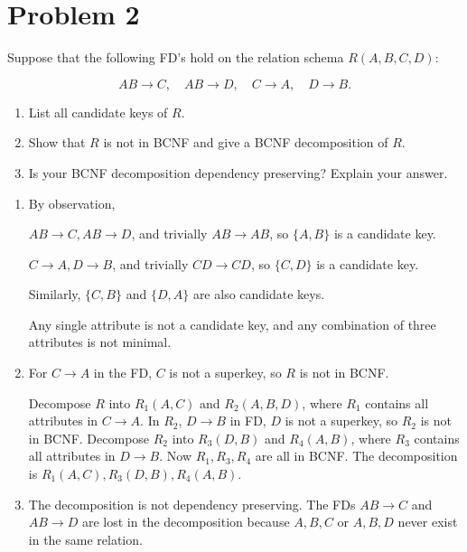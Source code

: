 \documentclass{article}
\begin{document}
\section*{Problem 2}
\begin{tcolorbox}[colback=gray!10, breakable]
	Suppose that the following FD's hold on the relation schema \( R(A,B,C,D) \):

	\[ AB \to C, \quad AB \to D, \quad C \to A, \quad D \to B. \]

	\begin{enumerate}
		\item List all candidate keys of \( R \).
		\item Show that \( R \) is not in BCNF and give a BCNF decomposition of \( R \).
		\item Is your BCNF decomposition dependency preserving? Explain your answer.
	\end{enumerate}
\end{tcolorbox}

\begin{enumerate}[1.]
	\item By observation, 
	
	$AB\to C, AB\to D$, and trivially $AB \to AB$, so $\{A, B\}$ is a candidate key.

	$C \to A, D \to B$, and trivially $CD \to CD$, so $\{C, D\}$ is a candidate key.

	Similarly, $\{C, B\}$ and $\{D, A\}$ are also candidate keys.

	Any single attribute is not a candidate key, and any combination of three attributes is not minimal.

	\item For $C \to A$ in the FD, $C$ is not a superkey, so $R$ is not in BCNF.
	
	Decompose $R$ into $R_1(A, C)$ and $R_2(A, B, D)$, where $R_1$ contains all attributes in $C \to A$. In $R_2$, $D \to B$ in FD, $D$ is not a superkey, so $R_2$ is not in BCNF. 
	Decompose $R_2$ into $R_3(D, B)$ and $R_4(A, B)$, where $R_3$ contains all attributes in $D \to B$. Now $R_1, R_3, R_4$ are all in BCNF.
	The decomposition is $R_1(A, C), R_3(D, B), R_4(A, B)$.

	\item The decomposition is not dependency preserving. The FDs $AB \to C$ and $AB \to D$ are lost in the decomposition because $A, B, C$ or $A, B, D$ never exist in the same relation.
\end{enumerate}
\end{document}
